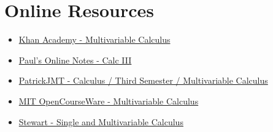 \section{Online Resources}
\begin{itemize}
	\item \href{https://www.khanacademy.org/math/multivariable-calculus}{Khan Academy - Multivariable Calculus}
	\item \href{http://tutorial.math.lamar.edu/Classes/CalcIII/CalcIII.aspx}{Paul's Online Notes - Calc III}
	\item \href{https://www.youtube.com/playlist?list=PLF83D74BA4DE75897}{PatrickJMT - Calculus / Third Semester / Multivariable Calculus}
	\item \href{https://ocw.mit.edu/courses/mathematics/18-02sc-multivariable-calculus-fall-2010/}{MIT OpenCourseWare - Multivariable Calculus}
	\item \href{https://www.whitman.edu/mathematics/multivariable/multivariable.pdf}{Stewart  - Single and Multivariable Calculus}
\end{itemize}